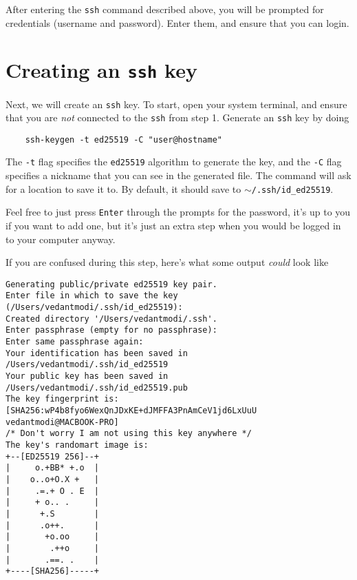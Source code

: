 \documentclass[12pt]{article}
\begin{document}
After entering the \texttt{ssh} command described above, you will be prompted
for credentials (username and password). Enter them, and ensure that you can
login.

\section{Creating an \texttt{ssh} key}
\vspace{1\baselineskip}

Next, we will create an \texttt{ssh} key. To start, open your system terminal,
and ensure that you are \textit{not} connected to the \texttt{ssh} from step 1.
Generate an \texttt{ssh} key by doing \begin{verbatim}
    ssh-keygen -t ed25519 -C "user@hostname"
\end{verbatim}

The \texttt{-t} flag specifies the \texttt{ed25519} algorithm to generate the
key, and the \texttt{-C} flag specifies a nickname that you can see in the
generated file. The command will ask for a location to save it to. 
By default, it should save to \texttt{$\sim$/.ssh/id\_ed25519}. 

Feel free to just press \texttt{Enter} through the prompts for the password,
it's up to you if you want to add one, but it's just an extra step when you
would be logged in to your computer anyway.

\vspace{0.2\baselineskip}

If you are confused during this step, here's what some output \textit{could}
look like 

\begin{verbatim}
Generating public/private ed25519 key pair.
Enter file in which to save the key (/Users/vedantmodi/.ssh/id_ed25519): 
Created directory '/Users/vedantmodi/.ssh'.
Enter passphrase (empty for no passphrase):
Enter same passphrase again: 
Your identification has been saved in /Users/vedantmodi/.ssh/id_ed25519
Your public key has been saved in /Users/vedantmodi/.ssh/id_ed25519.pub
The key fingerprint is:
[SHA256:wP4b8fyo6WexQnJDxKE+dJMFFA3PnAmCeV1jd6LxUuU vedantmodi@MACBOOK-PRO] 
/* Don't worry I am not using this key anywhere */
The key's randomart image is:
+--[ED25519 256]--+
|     o.+BB* +.o  |
|    o..o+O.X +   |
|     .=.+ O . E  |
|     + o.. .     |
|      +.S        |
|      .o++.      |
|       +o.oo     |
|        .++o     |
|       .==. .    |
+----[SHA256]-----+
    
\end{verbatim}
\end{document}
